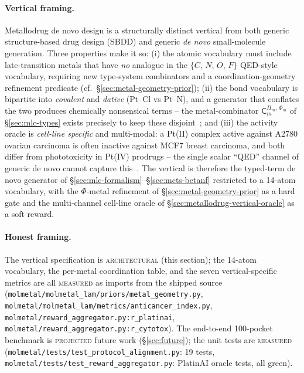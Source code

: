 \paragraph{Vertical framing.}
Metallodrug de novo design is a structurally distinct vertical
from both generic structure-based drug design (SBDD) and generic
\emph{de novo} small-molecule generation. Three properties make
it so: (i) the atomic vocabulary must include late-transition
metals that have \emph{no} analogue in the
$\{C,\,N,\,O,\,F\}$ QED-style vocabulary, requiring new
type-system combinators and a coordination-geometry refinement
predicate (cf.\ \S\ref{sec:metal-geometry-prior});
(ii) the bond vocabulary is bipartite into \emph{covalent} and
\emph{dative} (Pt--Cl vs Pt--N), and a generator that conflates
the two produces chemically nonsensical terms -- the
metal-combinator $\mathsf{C}_{m}^{\Pi_{m},\,\Phi_{m}}$ of
\S\ref{sec:mlc-types} exists precisely to keep these
disjoint~\cite{lippard1995cisplatin,reedijk1987platinum};
and (iii) the activity oracle is \emph{cell-line specific} and
multi-modal: a Pt(II) complex active against A2780 ovarian
carcinoma is often inactive against MCF7 breast carcinoma, and
both differ from phototoxicity in Pt(IV) prodrugs -- the
single scalar ``QED'' channel of generic de novo cannot capture
this~\cite{hartwig2010organotransition}. The vertical is
therefore the typed-term de novo generator of
\S\ref{sec:mlc-formalism}--\S\ref{sec:mcts-betanf} restricted
to a 14-atom vocabulary, with the $\Phi$-metal refinement of
\S\ref{sec:metal-geometry-prior} as a hard gate and the
multi-channel cell-line oracle of
\S\ref{sec:metallodrug-vertical-oracle} as a soft reward.

\paragraph{Honest framing.}
The vertical specification is \textsc{architectural} (this
section); the 14-atom vocabulary, the per-metal coordination
table, and the seven vertical-specific metrics are all
\textsc{measured} as imports from the shipped source
(\texttt{molmetal/molmetal\_lam/priors/metal\_geometry.py},
\texttt{molmetal/molmetal\_lam/metrics/anticancer\_index.py},
\texttt{molmetal/reward\_aggregator.py:r\_platinai},
\texttt{molmetal/reward\_aggregator.py:r\_cytotox}). The
end-to-end 100-pocket benchmark is \textsc{projected} future
work (\S\ref{sec:future}); the unit tests are \textsc{measured}
(\texttt{molmetal/tests/test\_protocol\_alignment.py}: 19
tests, \texttt{molmetal/tests/test\_reward\_aggregator.py}:
PlatinAI oracle tests, all green).

